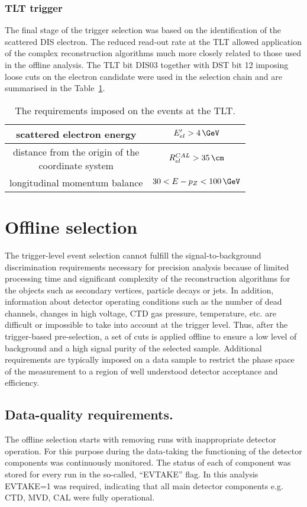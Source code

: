 \subsubsection{TLT trigger}
\label{subsec:tltcuts}
The final stage of the trigger selection was based on the identification of the scattered DIS electron. The reduced read-out rate at the TLT allowed application of the complex reconstruction algorithms much more closely related to those used in the offline analysis. The TLT bit \textsf{DIS03} together with DST bit 12 imposing loose cuts on the electron candidate were used in the selection chain and are summarised in the Table~\ref{tab:TLTDSTreq}.
\begin{table}[ht!]
\centering
\begin{tabular}{c|c}
\hline scattered electron energy & $E'_{el}>4\,\GeV$ \\ 
\hline \pbox{6cm}{distance from the origin of the \\ coordinate system}  & $R_{el}^{CAL}>35\,\cm$ \\ 
\hline longitudinal momentum balance & $30<E-p_Z<100\,\GeV$\\
\hline 
\end{tabular} 
\caption{The requirements imposed on the events at the TLT.}
\label{tab:TLTDSTreq}
\end{table}

\section{Offline selection}
\label{sec:offlineselect}
The trigger-level event selection cannot fulfill the signal-to-background discrimination requirements necessary for precision analysis because of limited processing time and significant complexity of the reconstruction algorithms for the objects such as secondary vertices, particle decays or jets. In addition, information about detector operating conditions such as the number of dead channels, changes in high voltage, CTD gas pressure, temperature, etc. are difficult or impossible to take into account at the trigger level. Thus, after the trigger-based pre-selection, a set of cuts is applied offline to ensure a low level of background and a high signal purity of the selected sample. Additional requirements are typically imposed on a data sample to restrict the phase space of the measurement to a region of well understood detector acceptance and efficiency.

\subsection{Data-quality requirements.}
The offline selection starts with removing runs with inappropriate detector operation. For this purpose during the data-taking the functioning of the detector components was continuously monitored. The status of each of component was stored for every run in the so-called, ``EVTAKE'' flag. In this analysis EVTAKE=1 was required, indicating that all main detector components e.g. CTD, MVD, CAL were fully operational.

